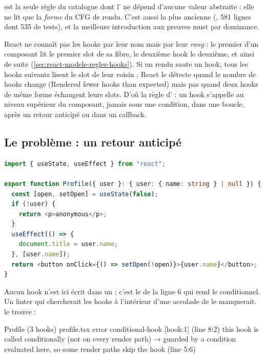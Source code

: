  est la seule règle du catalogue dont l'\Error{} ne dépend d'aucune valeur abstraite : elle ne lit que la \emph{forme} du CFG de rendu. C'est aussi la plus ancienne (, 581 lignes dont 535 de tests), et la meilleure introduction aux preuves must par dominance.

\begin{react}
React ne connaît pas les hooks par leur nom mais par leur \emph{rang} : le premier  d'un composant lit le premier slot de sa fibre, le deuxième hook le deuxième, et ainsi de suite (\cref{sec:react-modele-regles-hooks}). Si un rendu saute un hook, tous les hooks suivants lisent le slot de leur voisin ; React le détecte quand le nombre de hooks change (\og Rendered fewer hooks than expected\fg{}) mais pas quand deux hooks de même forme échangent leurs slots. D'où la règle d' : un hook s'appelle au niveau supérieur du composant, jamais sous une condition, dans une boucle, après un retour anticipé ou dans un callback.
\end{react}

\subsection{Le problème : un retour anticipé}

\begin{lstlisting}[language=TypeScript,caption={\file{/tmp/ch20/profile.tsx} : un effet placé après un retour anticipé},label={lst:regles-effets-profile}]
import { useState, useEffect } from "react";

export function Profile({ user }: { user: { name: string } | null }) {
  const [open, setOpen] = useState(false);
  if (!user) {
    return <p>anonymous</p>;
  }
  useEffect(() => {
    document.title = user.name;
  }, [user.name]);
  return <button onClick={() => setOpen(!open)}>{user.name}</button>;
}
\end{lstlisting}

Aucun hook n'est ici écrit dans un  ; c'est le  de la ligne 6 qui rend le  conditionnel. Un linter qui chercherait les hooks \og à l'intérieur d'une accolade de \fg{} le manquerait. \reactant{} le trouve :

\begin{sortie}
  Profile  (3 hooks)  profile.tsx
    error  conditional-hook  [hook:1]  (line 8:2)  this hook is called conditionally (not on every render path)
       → guarded by a condition evaluated here, so some render paths skip the hook (line 5:6)
\end{sortie}

